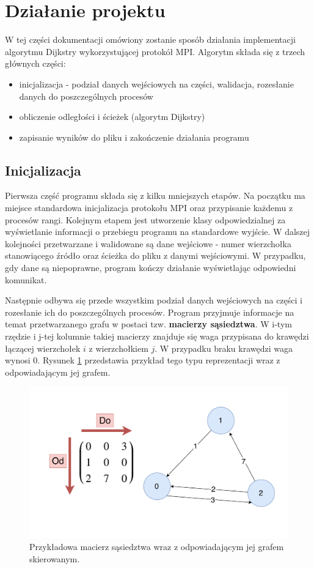 \documentclass[12pt]{article}
\begin{document}
\section{Działanie projektu}
W tej części dokumentacji omówiony zostanie sposób działania implementacji algorytmu Dijkstry wykorzystującej protokół MPI. Algorytm składa się z trzech głównych części:
\begin{itemize}
\item inicjalizacja - podział danych wejściowych na części, walidacja, rozesłanie danych do poszczególnych procesów
\item obliczenie odległości i ścieżek (algorytm Dijkstry)
\item zapisanie wyników do pliku i zakończenie działania programu
\end{itemize}


\subsection{Inicjalizacja}
Pierwsza część programu składa się z kilku mniejszych etapów. Na początku ma miejsce standardowa inicjalizacja protokołu MPI oraz przypisanie każdemu z procesów rangi. Kolejnym etapem jest utworzenie klasy odpowiedzialnej za wyświetlanie informacji o przebiegu programu na standardowe wyjście. W dalszej kolejności przetwarzane i walidowane są dane wejściowe - numer wierzchołka stanowiącego źródło oraz ścieżka do pliku z danymi wejściowymi. W przypadku, gdy dane są niepoprawne, program kończy działanie wyświetlając odpowiedni komunikat.

\vspace{5mm}
Następnie odbywa się przede wszystkim podział danych wejściowych na części i rozesłanie ich do poszczególnych procesów. Program przyjmuje informacje na temat przetwarzanego grafu w postaci tzw. \textbf{macierzy sąsiedztwa}. W i-tym rzędzie i j-tej kolumnie takiej macierzy znajduje się waga przypisana do krawędzi łączącej wierzchołek $i$ z wierzchołkiem $j$. W przypadku braku krawędzi waga wynosi 0. Rysunek \ref{fig:am1} przedstawia przykład tego typu reprezentacji wraz z odpowiadającym jej grafem.

\begin{figure}[H]
\centering
\includegraphics[width=\textwidth]{static/AdjacencyMatrixExample.pdf}
\caption{Przykładowa macierz sąsiedztwa wraz z odpowiadającym jej grafem skierowanym.}
\label{fig:am1}
\end{figure}
\end{document}
